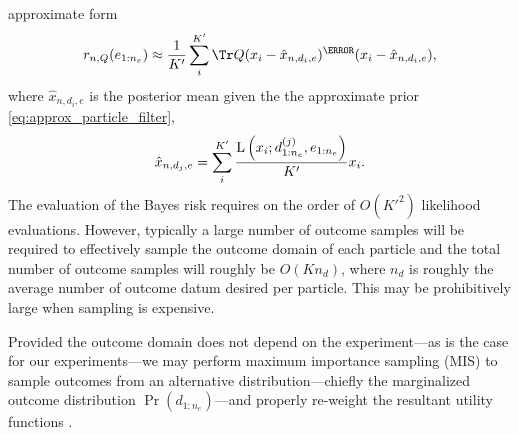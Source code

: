 \documentclass[aps,nofootinbib,twocolumn,superscriptaddress]{revtex4}
\newcommand{\mps}{x}
\newcommand{\eps}{e}
\newcommand{\data}{d}
\begin{document}
approximate form
\begin{align}
    r_{n,Q}(\eps_{1:n_e}) \approx \frac{1}{K'}\sum \limits_i^{K'} \Tr Q(\mps_i - \hat\mps_{n,\data_i,\eps})^\T(\mps_i - \hat\mps_{n,\data_i,\eps}),
    \label{eq:bayes-risk-sampled}
\end{align}
where $\hat\mps_{n,\data_i,\eps}$ is the posterior mean given the the
approximate prior \eqref{eq:approx_particle_filter},
\begin{align}
    \hat\mps_{n,\data_j,\eps} =
        \sum \limits_i^{K'} \frac{\Lhood \left(
            \mps_i;d_{1:n_e}^{(j)},\eps_{1:n_e}
        \right)}{K'}\mps_i.
\end{align}
The evaluation of the Bayes risk requires on the order of $O(K'^2)$ likelihood
evaluations.
However, typically a large number of outcome samples will be required to
effectively sample the outcome domain of each particle and the total number of
outcome samples will roughly be $O(Kn_d)$, where $n_d$ is roughly the average
number of outcome datum desired per particle. This may be prohibitively large
when sampling is expensive.

Provided the outcome domain does not depend on the experiment---as is the case
for our experiments---we may perform maximum importance sampling (MIS) to sample
outcomes from an alternative distribution---chiefly the marginalized outcome
distribution $\Pr(d_{1:n_e})$---and properly re-weight the resultant utility
functions \cite{UeberhuberNumericalComputationMethods1997}.
\end{document}
